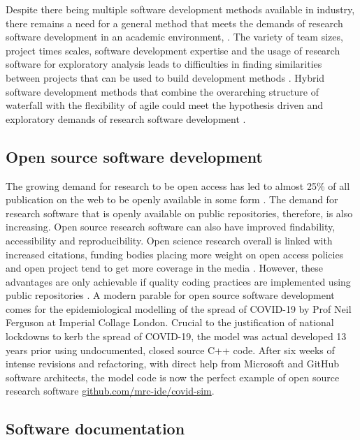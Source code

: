 \documentclass[../main.tex]{subfiles}
\begin{document}
Despite there being multiple software development methods available in industry, there remains a need for a general method that meets the demands of research software development in an academic environment, \parencite{Cereci2018}. 
The variety of team sizes, project times scales, software development expertise and the usage of research software for exploratory analysis leads to difficulties in finding similarities between projects that can be used to build development methods \parencite{Hannay2009, Diaz2019}.
Hybrid software development methods that combine the overarching structure of waterfall with the flexibility of agile could meet the hypothesis driven and exploratory demands of research software development \parencite{Pathak2012}.

\subsection{Open source software development}

The growing demand for research to be open access has led to almost 25\% of all publication on the web to be openly available in some form \parencite{Khabsa2014}.
The demand for research software that is openly available on public repositories, therefore, is also increasing. 
Open source research software can also have improved findability, accessibility and reproducibility.
Open science research overall is linked with increased citations, funding bodies placing more weight on open access policies and open project tend to get more coverage in the media \parencite{McKiernan2016}.
However, these advantages are only achievable if quality coding practices are implemented using public repositories \parencite{Prlic2012}.
A modern parable for open source software development comes for the epidemiological modelling of the spread of COVID-19 by Prof Neil Ferguson at Imperial Collage London.
Crucial to the justification of national lockdowns to kerb the spread of COVID-19, the model was actual developed 13 years prior using undocumented, closed source C++ code.
After six weeks of intense revisions and refactoring, with direct help from Microsoft and GitHub software architects, the model code is now the perfect example of open source research software \href{https://github.com/mrc-ide/covid-sim}{github.com/mrc-ide/covid-sim}.

\subsection{Software documentation}
\end{document}
